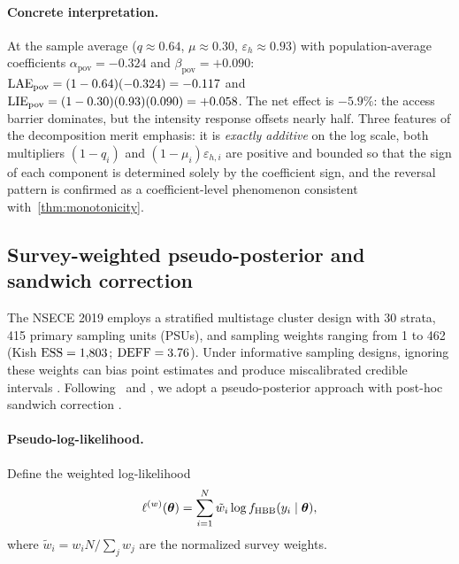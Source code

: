 \paragraph{Concrete interpretation.}
At the sample average ($q \approx 0.64$, $\mu \approx 0.30$,
$\varepsilon_h \approx 0.93$) with population-average coefficients
$\alpha_{\mathrm{pov}} = -0.324$ and $\beta_{\mathrm{pov}} = +0.090$:
$\operatorname{LAE}_{\mathrm{pov}} = (1 - 0.64)(-0.324) = -0.117$ and
$\operatorname{LIE}_{\mathrm{pov}} = (1 - 0.30)(0.93)(0.090) = +0.058$.
The net effect is $-5.9\%$: the access barrier dominates, but the intensity
response offsets nearly half.  Three features of the decomposition merit
emphasis: it is \emph{exactly additive} on the log scale, both multipliers
$(1-q_i)$ and $(1-\mu_i)\varepsilon_{h,i}$ are positive and bounded so that
the sign of each component is determined solely by the coefficient sign, and
the reversal pattern is confirmed as a coefficient-level phenomenon consistent
with~\cref{thm:monotonicity}.


\subsection{Survey-weighted pseudo-posterior and sandwich correction}
\label{sec:survey}

The NSECE 2019 employs a stratified multistage cluster design with 30 strata,
415 primary sampling units (PSUs), and sampling weights ranging from 1 to 462
(Kish $\text{ESS} = 1{,}803$; $\text{DEFF} = 3.76$). Under informative sampling designs,
ignoring these weights can bias point estimates and produce
miscalibrated credible intervals
\citep{PfeffermannEtAl1998}. Following~\citet{SavitskyToth2016} and
\citet{WilliamsSavitsky2021}, we adopt a pseudo-posterior approach with
post-hoc sandwich correction
\citep[see also][for a general treatment of weighting in multilevel
models]{RabeHeskethSkrondal2006}.

\paragraph{Pseudo-log-likelihood.}
Define the weighted log-likelihood
\begin{equation}\label{eq:pseudo-loglik}
  \ell^{(w)}(\boldsymbol{\theta})
  = \sum_{i=1}^{N} \tilde{w}_i \log f_{\operatorname{HBB}}(y_i \mid \boldsymbol{\theta}),
\end{equation}
where $\tilde{w}_i = w_i N / \sum_j w_j$ are the normalized survey weights.

